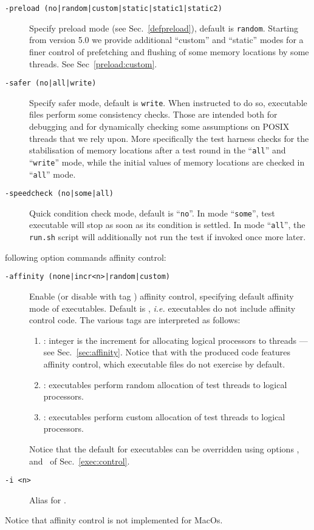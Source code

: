 \begin{description}
\item[{\tt -preload (no|random|custom|static|static1|static2)}]
Specify preload mode (see Sec.~\ref{defpreload}), default is \texttt{random}.
Starting from version 5.0 we provide additional ``custom'' and ``static''
modes for a finer control of prefetching and flushing of some memory locations
by some threads. See Sec~\ref{preload:custom}.
\item[{\tt -safer (no|all|write)}] Specify safer mode,
default is \texttt{write}.
When instructed to do so, executable files perform some consistency checks.
Those are intended both for debugging and for dynamically checking
some assumptions on POSIX threads that we rely upon.
More specifically the test harness checks for the stabilisation of
memory locations after a test round in the ``\texttt{all}'' and
``\texttt{write}'' mode, while
the initial values of memory locations are checked in ``\texttt{all}'' mode.
\item[{\tt -speedcheck (no|some|all)}]
Quick condition check mode,
default is ``\texttt{no}''.
In mode ``\texttt{some}'', test executable will stop as soon as its
condition is settled.
In mode ``\texttt{all}'', the \texttt{run.sh} script will additionally
not run the test if invoked once more later.
\end{description}

 following option commands affinity control:
\begin{description}
\item[{\tt -affinity (none|incr<n>|random|custom)}]
Enable (or disable with tag ) affinity control,
specifying default affinity mode of executables.
Default is , \emph{i.e.} executables do not
include affinity control code.
The various tags are interpreted as follows:
\begin{enumerate}
\item {}:
integer  is the increment  for allocating logical
processors to threads --- see Sec.~\ref{sec:affinity}.
Notice that with 
the produced code features affinity control, which executable
files do not exercise by default.
\item {}: executables perform random allocation of
test threads to logical processors.
\item {}: executables perform custom allocation of
test threads to logical processors.
\end{enumerate}
Notice that the default for executables can be overridden using
options , and~
of Sec.~\ref{exec:control}.

\item[{\tt -i <n>}] Alias for .
\end{description}
Notice that affinity control is not implemented for MacOs.


